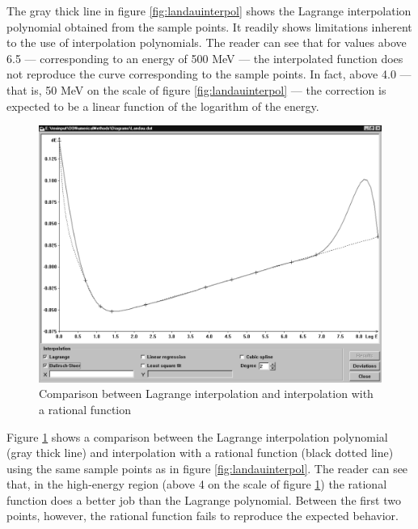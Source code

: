 \documentclass[twoside]{book}
\begin{document}
The gray thick line in figure \ref{fig:landauinterpol} shows the
Lagrange interpolation polynomial obtained from the sample points.
It readily shows limitations inherent to the use of interpolation
polynomials. The reader can see that for values above 6.5 ---
corresponding to an energy of 500 MeV --- the interpolated
function does not reproduce the curve corresponding to the sample
points. In fact, above 4.0 --- that is,  50 MeV on the scale of
figure \ref{fig:landauinterpol} --- the correction is expected to
be a linear function of the logarithm of the energy.

\begin{figure}
\label{fig:interpolex2}
\centering\includegraphics[width=12cm]{Figures/LagrangeVsRational}
\caption{Comparison between Lagrange interpolation and
interpolation with a rational function}
\end{figure}
Figure \ref{fig:interpolex2} shows a comparison between the
Lagrange interpolation polynomial (gray thick line) and
interpolation with a rational function (black dotted line) using
the same sample points as in figure \ref{fig:landauinterpol}. The
reader can see that, in the high-energy region (above 4 on the
scale of figure \ref{fig:interpolex2}) the rational function does
a better job than the Lagrange polynomial. Between the first two
points, however, the rational function fails to reproduce the
expected behavior.
\end{document}
